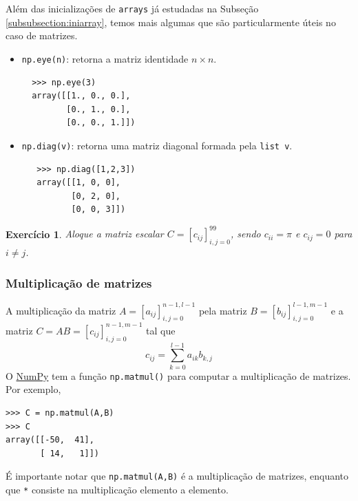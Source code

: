 \documentclass[12pt]{article}
\newtheorem{exr}{Exercício}[section]
\begin{document}
Além das inicializações de \lstinline+arrays+ já estudadas na Subseção \ref{subsubsection:iniarray}, temos mais algumas que são particularmente úteis no caso de matrizes.
\begin{itemize}
\item \lstinline+np.eye(n)+: retorna a matriz identidade $n\times n$.
  \begin{lstlisting}
  >>> np.eye(3)
  array([[1., 0., 0.],
         [0., 1., 0.],
         [0., 0., 1.]])
   \end{lstlisting}
 \item \lstinline+np.diag(v)+: retorna uma matriz diagonal formada pela \lstinline+list v+.
   \begin{lstlisting}
   >>> np.diag([1,2,3])
   array([[1, 0, 0],
          [0, 2, 0],
          [0, 0, 3]])
   \end{lstlisting}
 \end{itemize}

 \begin{exr}
   Aloque a matriz escalar $C = [c_{ij}]_{i,j=0}^{99}$, sendo $c_{ii}=\pi$ e $c_{ij}=0$ para $i\neq j$.
 \end{exr}

\subsubsection{Multiplicação de matrizes}

A multiplicação da matriz $A = [a_{ij}]_{i,j=0}^{n-1,l-1}$ pela matriz $B = [b_{ij}]_{i,j=0}^{l-1,m-1}$ e a matriz $C = AB = [c_{ij}]_{i,j=0}^{n-1,m-1}$ tal que
\begin{equation}
  c_{ij} = \sum_{k=0}^{l-1} a_{ik}b_{k,j}
\end{equation}
O \href{https://numpy.org/}{NumPy} tem a função \lstinline+np.matmul()+ para computar a multiplicação de matrizes. Por exemplo,
\begin{lstlisting}
>>> C = np.matmul(A,B)
>>> C
array([[-50,  41],
       [ 14,   1]])
\end{lstlisting}

\begin{obs}
  É importante notar que \lstinline+np.matmul(A,B)+ é a multiplicação de matrizes, enquanto que \lstinline+*+ consiste na multiplicação elemento a elemento.
\end{obs}
\end{document}
